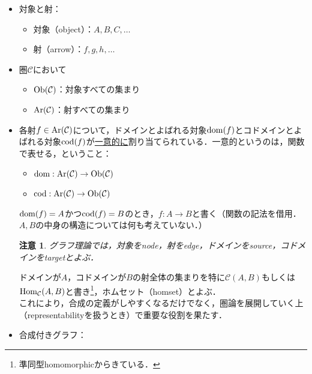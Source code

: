 \documentclass[dvipdfmx,a4j,10pt]{jsarticle}
\theoremstyle{mystyle1}
\theoremstyle{mystyle2}
\newtheorem{note*}{注意}
\newcommand{\Ob}{{\rm Ob}}
\newcommand{\Ar}{{\rm Ar}}
\newcommand{\dom}{{\rm dom}}
\newcommand{\cod}{{\rm cod}}
\newcommand{\Hom}{{\rm Hom}}
\begin{document}
\begin{itemize}
    \item 対象と射：
          \begin{itemize}
              \item 対象（object）：$A,B,C,\ldots$
              \item 射（arrow）：$f,g,h,\ldots$
          \end{itemize}
    \item 圏$\mathcal{C}$において
          \begin{itemize}
              \item $\Ob(\mathcal{C})$：対象すべての集まり
              \item $\Ar(\mathcal{C})$：射すべての集まり
          \end{itemize}
    \item 各射$f\in \Ar(\mathcal{C})$について，ドメインとよばれる対象$\dom(f)$とコドメインとよばれる対象$\cod(f)$が\underline{一意的に}割り当てられている．一意的というのは，関数で表せる，ということ：
          \begin{itemize}
              \item $\dom :\Ar(\mathcal{C})\to \Ob(\mathcal{C})$
              \item $\cod :\Ar(\mathcal{C})\to \Ob(\mathcal{C})$
          \end{itemize}
          $\dom(f)=A$かつ$\cod(f)=B$のとき，$f:A\to B$と書く（関数の記法を借用．$A,B$の中身の構造については何も考えていない．）
          \begin{note*}
              グラフ理論では，対象をnode，射をedge，ドメインをsource，コドメインをtargetとよぶ．
          \end{note*}
          ドメインが$A$，コドメインが$B$の射全体の集まりを特に$\mathcal{C}(A,B)$もしくは$\Hom_{\mathcal{C}}(A,B)$と書き\footnote{準同型homomorphicからきている．}，ホムセット（homset）とよぶ．\\
          これにより，合成の定義がしやすくなるだけでなく，圏論を展開していく上（representabilityを扱うとき）で重要な役割を果たす．
    \item 合成付きグラフ：
          \begin{center}
              \vspace{-1zh}
\end{center}
\end{itemize}
\end{document}
